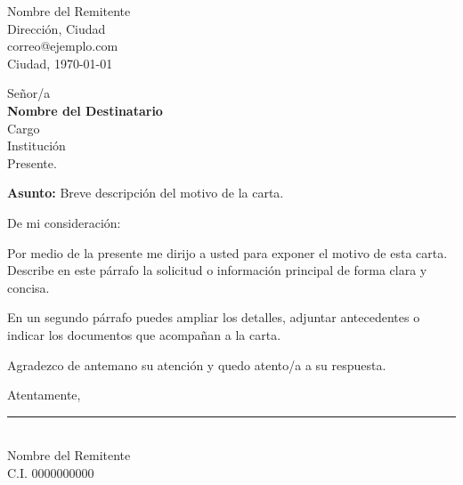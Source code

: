 \documentclass[11pt,a4paper]{article}
\begin{document}
\begin{flushright}
  Nombre del Remitente\\
  Dirección, Ciudad\\
  correo@ejemplo.com\\[1em]
  Ciudad, \today
\end{flushright}

Señor/a\\
\textbf{Nombre del Destinatario}\\
Cargo\\
Institución\\
Presente.

\vspace{1em}
\textbf{Asunto:} Breve descripción del motivo de la carta.

De mi consideración:

Por medio de la presente me dirijo a usted para exponer el motivo de esta carta.
Describe en este párrafo la solicitud o información principal de forma clara y concisa.

En un segundo párrafo puedes ampliar los detalles, adjuntar antecedentes o indicar los
documentos que acompañan a la carta.

Agradezco de antemano su atención y quedo atento/a a su respuesta.

Atentamente,

\vspace{2.5cm}
\rule{6cm}{0.4pt}\\
Nombre del Remitente\\
C.I. 0000000000
\end{document}
